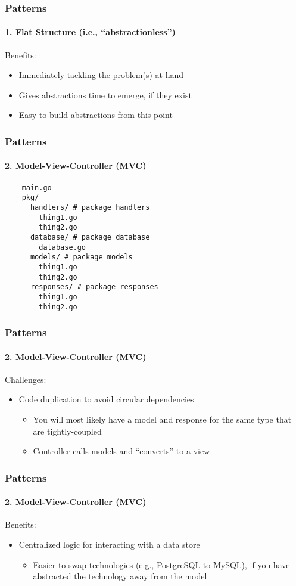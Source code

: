 \begin{frame}[fragile]
  \frametitle{Patterns}
  \framesubtitle{1. Flat Structure (i.e., ``abstractionless'')}

  Benefits:
  \begin{itemize}
    \pause
    \item Immediately tackling the problem(s) at hand
    \pause
    \item Gives abstractions time to emerge, if they exist
    \pause
    \item Easy to build abstractions from this point
  \end{itemize}

\end{frame}

\begin{frame}[fragile]
  \frametitle{Patterns}
  \framesubtitle{2. Model-View-Controller (MVC)}

  \begin{verbatim}
    main.go
    pkg/
      handlers/ # package handlers
        thing1.go
        thing2.go
      database/ # package database
        database.go
      models/ # package models
        thing1.go
        thing2.go
      responses/ # package responses
        thing1.go
        thing2.go
  \end{verbatim}
\end{frame}

\begin{frame}[fragile]
  \frametitle{Patterns}
  \framesubtitle{2. Model-View-Controller (MVC)}

  Challenges:
  \begin{itemize}
    \item Code duplication to avoid circular dependencies
    \begin{itemize}
      \item You will most likely have a model and response for the same type that are tightly-coupled
      \item Controller calls models and ``converts'' to a view
    \end{itemize}
  \end{itemize}
\end{frame}

\begin{frame}[fragile]
  \frametitle{Patterns}
  \framesubtitle{2. Model-View-Controller (MVC)}

  Benefits:
  \begin{itemize}
    \item Centralized logic for interacting with a data store
    \begin{itemize}
      \item Easier to swap technologies (e.g., PostgreSQL to MySQL), if you have abstracted the technology away from the model

    \end{itemize}
  \end{itemize}

\end{frame}

